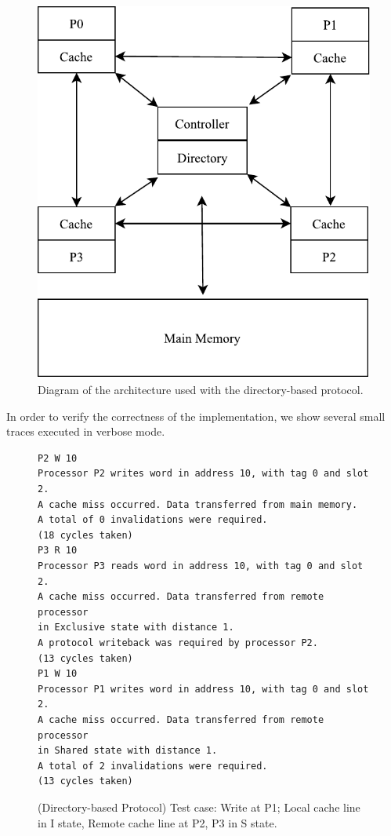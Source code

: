 \documentclass[12pt, a4paper, twoside]{article}
\begin{document}
\begin{figure}
\centering
\includegraphics{figs/DirectoryCache.pdf}
\caption{Diagram of the architecture used with the directory-based protocol.}
\label{fig:dir-arch}
\end{figure}

In order to verify the correctness of the implementation, we show several small
traces executed in verbose mode.

\begin{figure}[h]
\begin{verbatim}
P2 W 10
Processor P2 writes word in address 10, with tag 0 and slot 2.
A cache miss occurred. Data transferred from main memory.
A total of 0 invalidations were required.
(18 cycles taken)
P3 R 10
Processor P3 reads word in address 10, with tag 0 and slot 2.
A cache miss occurred. Data transferred from remote processor
in Exclusive state with distance 1.
A protocol writeback was required by processor P2.
(13 cycles taken)
P1 W 10
Processor P1 writes word in address 10, with tag 0 and slot 2.
A cache miss occurred. Data transferred from remote processor
in Shared state with distance 1.
A total of 2 invalidations were required.
(13 cycles taken)
\end{verbatim}
\caption{(Directory-based Protocol) Test case: Write at P1; Local cache line in I state, Remote cache line at
P2, P3 in S state.}
\end{figure}
\end{document}
